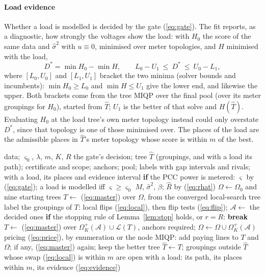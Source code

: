\documentclass[journal,onecolumn,11pt]{IEEEtran}
\newcommand{\Lin}{\mathcal{L}}
\newcommand{\Aset}{\mathcal{A}}
\begin{document}
\paragraph*{Load evidence} Whether a load is modelled is decided by the gate (\ref{eq:gate}). The fit reports, as a
diagnostic, how strongly the voltages show the load: with $H_0$ the score of the same data and $\hat\sigma^2$ with
$u\equiv0$, minimised over meter topologies, and $H$ minimised with the load,
\begin{equation}\label{eq:evidence}
D^*=\min H_0-\min H,\qquad L_0-U_1\ \le\ D^*\ \le\ U_0-L_1,
\end{equation}
where $[L_0,U_0]$ and $[L_1,U_1]$ bracket the two minima (solver bounds and incumbents): $\min H_0\ge L_0$ and $\min H\le U_1$
give the lower end, and likewise the upper. Both brackets come from the tree MIQP over the final pool (over its meter
groupings for $H_0$), started from $\hat T$; $U_1$ is the better of that solve and $H(\hat T)$. Evaluating $H_0$ at the load tree's own meter topology instead could only
overstate $D^*$, since that topology is one of those minimised over. The places of the load are the admissible places in
$\hat T$'s meter topology whose score is within $m$ of the best.

\begin{algorithm}[t]
\caption{\textsc{Identify}: gate, tree, anchors and labels}\label{alg:identify}
\begin{algorithmic}[1]
\Require data; $\varsigma_0$, $\lambda$, $m$, $K$, $R$
\Ensure the gate's decision; tree $\hat T$ (groupings, and with a load its path); certificate and scope; anchors; pool;
labels with gap intervals and rivals; with a load, its places and evidence interval
\State \textbf{if} the PCC power is metered: $\varsigma$ by (\ref{eq:gate}); a load is modelled iff $\varsigma\ge\varsigma_0$ 
\State $M$, $\hat\sigma^2$, $\beta$; $\hat R$ by (\ref{eq:rhat}) 
\State $\Omega\gets\Omega_0$ and nine starting trees 
\State $T\gets$ (\ref{eq:master}) over $\Omega$, from the converged local-search tree
  \State label the groupings of $T$: local flips (\ref{eq:local}), then flip tests (\ref{eq:flip}); $\Aset\gets$ the decided ones
  \State \textbf{if} the stopping rule of Lemma~\ref{lem:stop} holds, or $r=R$: \textbf{break}
  \State $T\gets$ (\ref{eq:master}) over $\Omega^+_K(\Aset)\cup\Lin(T)$, anchors required; $\Omega\gets\Omega\cup\Omega^+_K(\Aset)$
  \State pricing (\ref{eq:price}), by enumeration or the node MIQP: add paying lines to $T$ and $\Omega$; if any, (\ref{eq:master}) again; keep the better tree
\EndFor
\State $\hat T\gets T$; groupings outside $\hat T$ whose swap (\ref{eq:local}) is within $m$ are open
\State with a load: its path, its places within $m$, its evidence (\ref{eq:evidence})
\end{algorithmic}
\end{algorithm}
\end{document}
